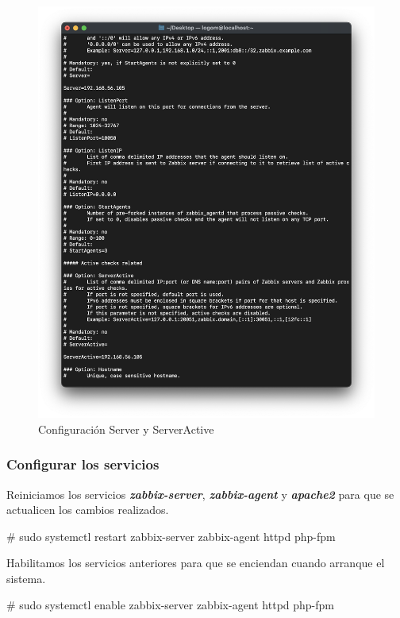     \begin{figure}[H]
        \centering
        \includegraphics[scale=0.4]{images/centos_servers.png}
        \caption{Configuración Server y ServerActive}
        \label{fig:centos_servers}
    \end{figure}    

    \subsubsection{Configurar los servicios}
    Reiniciamos los servicios \textbf{\emph{zabbix-server}}, \textbf{\emph{zabbix-agent}} y \textbf{\emph{apache2}} para que se actualicen los cambios realizados.
        \begin{tcolorbox}[colback=black!10, halign=left]
            \# sudo systemctl restart zabbix-server zabbix-agent httpd php-fpm
        \end{tcolorbox}

    Habilitamos los servicios anteriores para que se enciendan cuando arranque el sistema.
        \begin{tcolorbox}[colback=black!10, halign=left]
            \# sudo systemctl enable zabbix-server zabbix-agent httpd php-fpm
        \end{tcolorbox}

